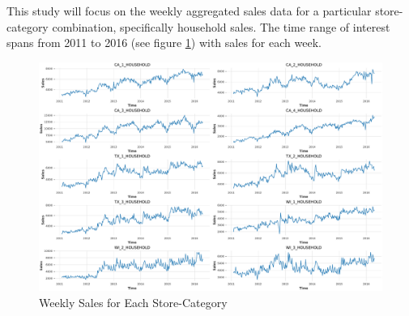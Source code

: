 This study will focus on the weekly aggregated sales data for a particular store-category combination, specifically household sales. The time range of interest spans from 2011 to 2016 (see figure \ref{fig:weekly_sales}) with sales for each week. 

\begin{figure}[H]
	\centering
	\includegraphics[width=1\textwidth]{./figures/raw_data.pdf}
	\caption{Weekly Sales for Each Store-Category}
	\label{fig:weekly_sales}
\end{figure}



